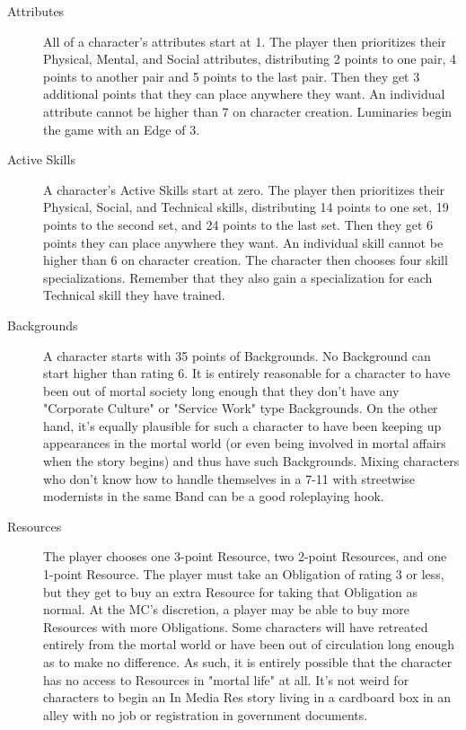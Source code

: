 \begin{description}
\item[Attributes]
All of a character's attributes start at 1. The player then prioritizes their Physical, Mental, and Social attributes, distributing 2 points to one pair, 4 points to another pair and 5 points to the last pair. Then they get 3 additional points that they can place anywhere they want. An individual attribute cannot be higher than 7 on character creation.
Luminaries begin the game with an Edge of 3.

\item[Active Skills]
A character's Active Skills start at zero. The player then prioritizes their Physical, Social, and Technical skills, distributing 14 points to one set, 19 points to the second set, and 24 points to the last set. Then they get 6 points they can place anywhere they want. An individual skill cannot be higher than 6 on character creation. The character then chooses four skill specializations. Remember that they also gain a specialization for each Technical skill they have trained.

\item[Backgrounds]
A character starts with 35 points of Backgrounds. No Background can start higher than rating 6. It is entirely reasonable for a character to have been out of mortal society long enough that they don't have any "Corporate Culture" or "Service Work" type Backgrounds. On the other hand, it's equally plausible for such a character to have been keeping up appearances in the mortal world (or even being involved in mortal affairs when the story begins) and thus have such Backgrounds. Mixing characters who don't know how to handle themselves in a 7-11 with streetwise modernists in the same Band can be a good roleplaying hook.

\item[Resources]
The player chooses one 3-point Resource, two 2-point Resources, and one 1-point Resource. The player must take an Obligation of rating 3 or less, but they get to buy an extra Resource for taking that Obligation as normal. At the MC's discretion, a player may be able to buy more Resources with more Obligations. Some characters will have retreated entirely from the mortal world or have been out of circulation long enough as to make no difference. As such, it is entirely possible that the character has no access to Resources in "mortal life" at all. It's not weird for characters to begin an In Media Res story living in a cardboard box in an alley with no job or registration in government documents.


\end{description}
